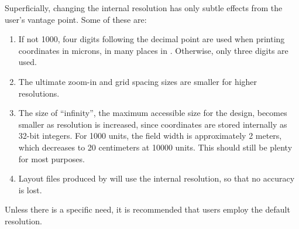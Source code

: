 Superficially, changing the internal resolution has only subtle
effects from the user's vantage point.  Some of these are:

\begin{enumerate}
\item{If not 1000, four digits following the decimal point are used
when printing coordinates in microns, in many places in {\Xic}. 
Otherwise, only three digits are used.}

\item{The ultimate zoom-in and grid spacing sizes are smaller for
higher resolutions.}

\item{The size of ``infinity'', the maximum accessible size for the
design, becomes smaller as resolution is increased, since
coordinates are stored internally as 32-bit integers.  For 1000
units, the field width is approximately 2 meters, which decreases
to 20 centimeters at 10000 units.  This should still be plenty for
most purposes.}

\item{Layout files produced by {\Xic} will use the internal
resolution, so that no accuracy is lost.}
\end{enumerate}

Unless there is a specific need, it is recommended that users employ
the default resolution.

